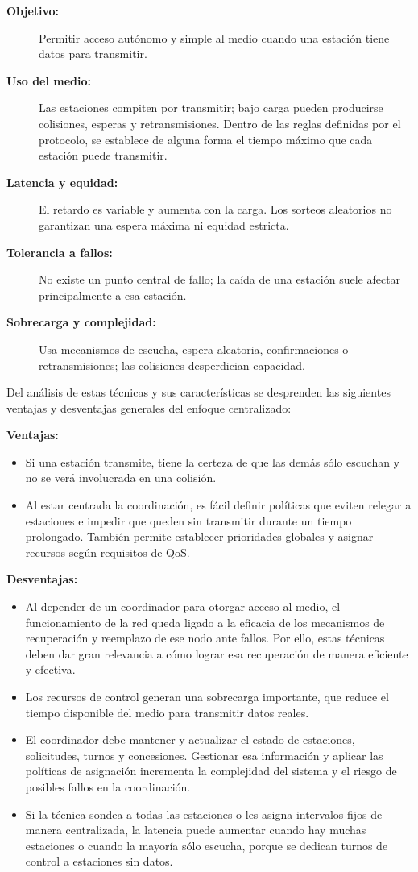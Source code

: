 \documentclass[11pt,a4paper]{article}
\begin{document}
\begin{itemize}
\begin{description}
    \item[\textbf{Objetivo:}] Permitir acceso autónomo y simple al medio cuando una estación tiene datos para transmitir.
    \item[\textbf{Uso del medio:}] Las estaciones compiten por transmitir; bajo carga pueden producirse colisiones, esperas y retransmisiones. Dentro de las reglas definidas por el protocolo, se establece de alguna forma el tiempo máximo que cada estación puede transmitir.
    \item[\textbf{Latencia y equidad:}] El retardo es variable y aumenta con la carga. Los sorteos aleatorios no garantizan una espera máxima ni equidad estricta.
    \item[\textbf{Tolerancia a fallos:}] No existe un punto central de fallo; la caída de una estación suele afectar principalmente a esa estación.
    \item[\textbf{Sobrecarga y complejidad:}] Usa mecanismos de escucha, espera aleatoria, confirmaciones o retransmisiones; las colisiones desperdician capacidad.
  \end{description}
\end{itemize}

Del análisis de estas técnicas y sus características se desprenden las siguientes ventajas y desventajas generales del enfoque centralizado:

\textbf{Ventajas:}
\begin{itemize}
  \item Si una estación transmite, tiene la certeza de que las demás sólo escuchan y no se verá involucrada en una colisión.
  \item Al estar centrada la coordinación, es fácil definir políticas que eviten relegar a estaciones e impedir que queden sin transmitir durante un tiempo prolongado. También permite establecer prioridades globales y asignar recursos según requisitos de QoS.
\end{itemize}

\textbf{Desventajas:}
\begin{itemize}
  \item Al depender de un coordinador para otorgar acceso al medio, el funcionamiento de la red queda ligado a la eficacia de los mecanismos de recuperación y reemplazo de ese nodo ante fallos. Por ello, estas técnicas deben dar gran relevancia a cómo lograr esa recuperación de manera eficiente y efectiva.
  \item Los recursos de control generan una sobrecarga importante, que reduce el tiempo disponible del medio para transmitir datos reales.
  \item El coordinador debe mantener y actualizar el estado de estaciones, solicitudes, turnos y concesiones. Gestionar esa información y aplicar las políticas de asignación incrementa la complejidad del sistema y el riesgo de posibles fallos en la coordinación.
  \item Si la técnica sondea a todas las estaciones o les asigna intervalos fijos de manera centralizada, la latencia puede aumentar cuando hay muchas estaciones o cuando la mayoría sólo escucha, porque se dedican turnos de control a estaciones sin datos.
\end{itemize}
\end{document}
